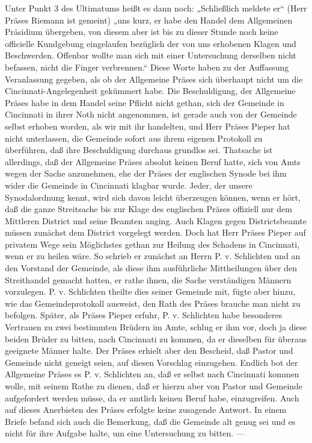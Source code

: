 Unter Punkt 3 des Ultimatums heißt es dann noch: „Schließlich meldete er“ (Herr Präses Riemann ist gemeint) „uns kurz, er habe den Handel dem Allgemeinen Präsidium übergeben, von diesem aber ist bis zu dieser Stunde noch keine officielle Kundgebung eingelaufen bezüglich der von uns erhobenen Klagen und Beschwerden. Offenbar wollte man sich mit einer Untersuchung derselben nicht befassen, nicht die Finger verbrennen.“ Diese Worte haben zu der Auffassung Veranlassung gegeben, als ob der Allgemeine Präses sich überhaupt nicht um die Cincinnati-Angelegenheit gekümmert habe. Die Beschuldigung, der Allgemeine Präses habe in dem Handel seine Pflicht nicht gethan, sich der Gemeinde in Cincinnati in ihrer Noth nicht angenommen, ist gerade auch von der Gemeinde selbst erhoben worden, als wir mit ihr handelten, und Herr Präses Pieper hat nicht unterlassen, die Gemeinde sofort aus ihrem eigenen Protokoll zu überführen, daß ihre Beschuldigung durchaus grundlos sei. Thatsache ist allerdings, daß der Allgemeine Präses absolut keinen Beruf hatte, sich von Amts wegen der Sache anzunehmen, ehe der Präses der englischen Synode bei ihm wider die Gemeinde in Cincinnati klagbar wurde. Jeder, der unsere Synodalordnung kennt, wird sich davon leicht überzeugen können, wenn er hört, daß die ganze Streitsache bis zur Klage des englischen Präses offiziell nur dem Mittleren District und seine Beamten anging. Auch Klagen gegen Districtsbeamte müssen zunächst dem District vorgelegt werden. Doch hat Herr Präses Pieper auf privatem Wege sein Möglichstes gethan zur Heilung des Schadens in Cincinnati, wenn er zu heilen wäre. So schrieb er zunächst an Herrn P. v. Schlichten und an den Vorstand der Gemeinde, als diese ihm ausführliche Mittheilungen über den Streithandel gemacht hatten, er rathe ihnen, die Sache verständigen Männern vorzulegen. P. v. Schlichten theilte dies seiner Gemeinde mit, fügte aber hinzu, wie das Gemeindeprotokoll ausweist,
den Rath des Präses brauche man nicht zu befolgen. Später, als Präses Pieper erfuhr, P. v. Schlichten habe besonderes Vertrauen zu zwei bestimmten Brüdern im Amte, schlug er ihm vor, doch ja diese beiden Brüder zu bitten, nach Cincinnati zu kommen, da er dieselben für überaus geeignete Männer halte. Der Präses erhielt aber den Bescheid, daß Pastor und Gemeinde nicht geneigt seien, auf diesen Vorschlag einzugehen. Endlich bot der Allgemeine Präses es P. v. Schlichten an, daß er selbst nach Cincinnati kommen wolle, mit seinem Rathe zu dienen, daß er hierzu aber von Pastor und Gemeinde aufgefordert werden müsse, da er amtlich keinen Beruf habe, einzugreifen. Auch auf dieses Anerbieten des Präses erfolgte keine zusagende Antwort. In einem Briefe befand sich auch die Bemerkung, daß die Gemeinde alt genug sei und es nicht für ihre Aufgabe halte, um eine Untersuchung zu bitten. —


